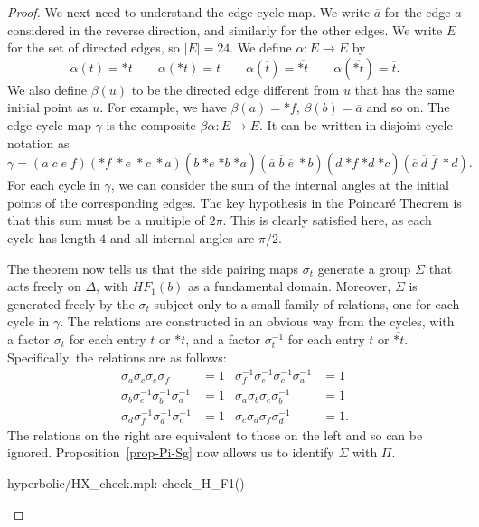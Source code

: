 \documentclass[reqno]{amsart}
\newcommand{\Dl}        {\Delta}
\newcommand{\Sg}        {\Sigma}
\newcommand{\al}        {\alpha}
\newcommand{\bt}        {\beta}
\newcommand{\gm}        {\gamma}
\newcommand{\sg}        {\sigma}
\newcommand{\ov}[1]     {\overline{#1}}
\renewcommand{\:}{\colon}
\theoremstyle{definition}
\begin{document}
\begin{proof}
 We next need to understand the edge cycle map.  We write $\ov{a}$ for
 the edge $a$ considered in the reverse direction, and similarly for
 the other edges.  We write $E$ for the set of directed edges, so
 $|E|=24$.  We define $\al\:E\to E$ by
 \[ \al(t) = *t \qquad
    \al(*t) = t \qquad
    \al(\ov{t}) = \ov{*t} \qquad
    \al(\ov{*t}) = \ov{t}.
 \]
 We also define $\bt(u)$ to be the directed edge different from $u$
 that has the same initial point as $u$.  For example, we have
 $\bt(a)=*f$, $\bt(b)=\ov{a}$ and so on.  The edge cycle map $\gm$ is
 the composite $\bt\al\:E\to E$.  It can be written in disjoint cycle
 notation as
 \[ \gm = (a\;c\;e\;f)
          (*f\;*e\;*c\;*a)
          (b\;\ov{*e}\;\ov{*b}\;\ov{*a})
          (\ov{a}\;\ov{b}\;\ov{e}\;*b)
          (d\;\ov{*f}\;\ov{*d}\;\ov{*c})
          (\ov{c}\;\ov{d}\;\ov{f}\;*d).
 \]
 For each cycle in $\gm$, we can consider the sum of the internal
 angles at the initial points of the corresponding edges.  The key
 hypothesis in the Poincar\'e Theorem is that this sum must be a
 multiple of $2\pi$.  This is clearly satisfied here, as each cycle
 has length $4$ and all internal angles are $\pi/2$.

 The theorem now tells us that the side pairing maps $\sg_t$ generate
 a group $\Sg$ that acts freely on $\Dl$, with $HF_1(b)$ as a fundamental
 domain.  Moreover, $\Sg$ is generated freely by the $\sg_t$ subject
 only to a small family of relations, one for each cycle in $\gm$.
 The relations are constructed in an obvious way from the cycles, with
 a factor $\sg_t$ for each entry $t$ or $*t$, and a factor
 $\sg_t^{-1}$ for each entry $\ov{t}$ or $\ov{*t}$.  Specifically, the
 relations are as follows:
 \begin{align*}
  \sg_a\sg_c\sg_e\sg_f &= 1 &
  \sg_f^{-1}\sg_e^{-1}\sg_c^{-1}\sg_a^{-1} &= 1 \\
  \sg_b\sg_e^{-1}\sg_b^{-1}\sg_a^{-1} &= 1 &
  \sg_a\sg_b\sg_e\sg_b^{-1} &= 1 \\
  \sg_d\sg_f^{-1}\sg_d^{-1}\sg_c^{-1} &= 1 &
  \sg_c\sg_d\sg_f\sg_d^{-1} &= 1.
 \end{align*}
 The relations on the right are equivalent to those on the left and so
 can be ignored.  Proposition~\ref{prop-Pi-Sg} now allows us to
 identify $\Sg$ with $\Pi$.
 \begin{checks}
  hyperbolic/HX_check.mpl: check_H_F1()
 \end{checks}
\end{proof}
\end{document}
